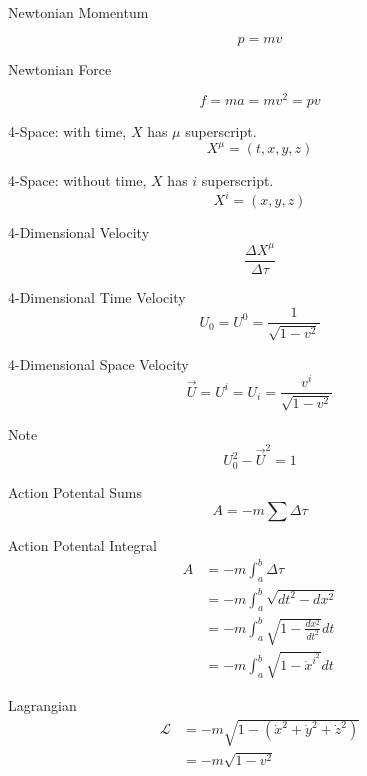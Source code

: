 \documentclass{article}
\begin{document}
Newtonian Momentum

\begin{equation}
p = mv
\end{equation}

Newtonian Force

\begin{equation}
f = ma = mv^2 = pv
\end{equation}

4-Space: with time, $X$ has $\mu$ superscript.
\begin{equation}
X^\mu = (t, x, y, z)
\end{equation}

4-Space: without time, $X$ has $i$ superscript.
\begin{equation}
X^i = (x, y, z)
\end{equation}

4-Dimensional Velocity
\begin{equation}
\frac{\Delta X^\mu}{\Delta \tau}
\end{equation}

4-Dimensional Time Velocity
\begin{equation}
U_0 = U^0 = \frac{1}{\sqrt{1 - v^2}}
\end{equation}

4-Dimensional Space Velocity
\begin{equation}
\vec U = U^i = U_i = \frac{v^i}{\sqrt{1 - v^2}}
\end{equation}

Note
\begin{equation}
U_0^2 - \vec U^2 = 1
\end{equation}

Action Potental Sums
\begin{equation}
A = -m\sum{\Delta \tau}
\end{equation}

Action Potental Integral
\begin{equation}
\begin{split}
A  &= -m\int_a^b{\Delta \tau}\\
&= -m\int_a^b{\sqrt{dt^2 - dx^2}}\\
&= -m\int_a^b{\sqrt{1 - \frac{dx^2}{dt^2}} dt}\\
&= -m\int_a^b{\sqrt{1 - \dot x^{i^2}} dt}
\end{split}
\end{equation}

Lagrangian
\begin{equation}
\begin{split}
\mathscr{L} &= -m\sqrt{1 - \left( \dot x^{2} + \dot y^{2} + \dot z^{2} \right) }\\
&=-m\sqrt{1-v^2}
\end{split}
\end{equation}
\end{document}
